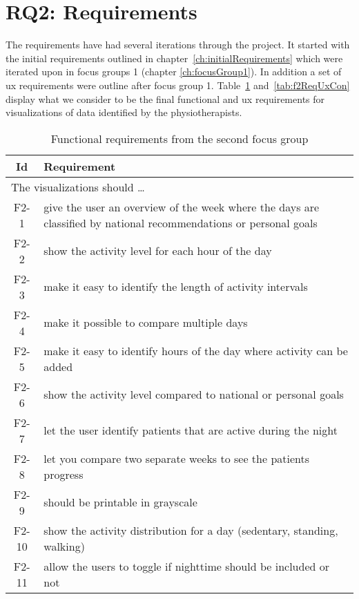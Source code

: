 \section{RQ2: Requirements}
The requirements have had several iterations through the project. It started with the initial requirements outlined in chapter~\ref{ch:initialRequirements} which were iterated upon in focus groups 1 (chapter \ref{ch:focusGroup1}). In addition a set of \gls{ux} requirements were outline after focus group 1. Table~\ref{tab:f2ReqCon} and~\ref{tab:f2ReqUxCon} display what we consider to be the final functional and \gls{ux} requirements for visualizations of data identified by the physiotherapists.
\begin{table}[h!]
  \begin{center}
  \begin{tabular}{|c|p{12cm}|}
    \hline
      \textbf{Id} & \textbf{Requirement} \\ \hline
    \multicolumn{2}{|l|}{The visualizations should \ldots} \\ \hline
      F2-1 & give the user an overview of the week where the days are classified by national recommendations or personal goals \\ \hline
      F2-2 & show the activity level for each hour of the day \\ \hline
      F2-3 & make it easy to identify the length of activity intervals \\ \hline
      F2-4 & make it possible to compare multiple days \\ \hline
      F2-5 & make it easy to identify hours of the day where activity can be added \\ \hline
      F2-6 & show the activity level compared to national or personal goals \\ \hline
      F2-7 & let the user identify patients that are active during the night \\ \hline
      F2-8 & let you compare two separate weeks to see the patients progress \\ \hline
      F2-9 & should be printable in grayscale \\ \hline
      F2-10 & show the activity distribution for a day (sedentary, standing, walking) \\ \hline
      F2-11 & allow the users to toggle if nighttime should be included or not \\ \hline
  \end{tabular}
  \end{center}
  \caption{Functional requirements from the second focus group}
  \label{tab:f2ReqCon}
\end{table}

